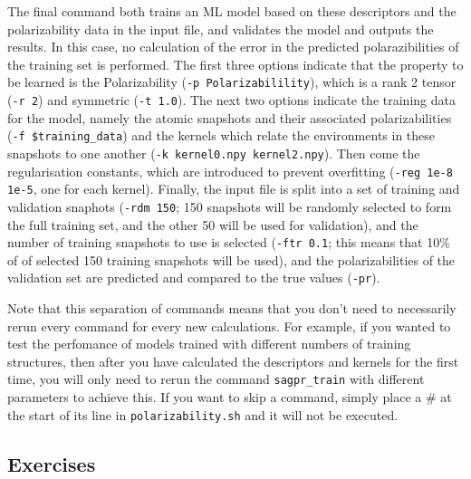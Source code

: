 \documentclass{article}
\begin{document}
The final command both trains an ML model based on these descriptors and the polarizability data in the input file, and validates the model and outputs the results. In this case, no calculation of the error in the predicted polarazibilities of the training set is performed. The first three options indicate that the property to be learned is the Polarizability (\verb|-p Polarizabilility|), which is a rank 2 tensor (\verb|-r 2|) and symmetric (\verb|-t 1.0|). The next two options indicate the training data for the model, namely the atomic snapshots and their associated polarizabilities (\verb|-f $training_data|) and the kernels which relate the environments in these snapshots to one another (\verb|-k kernel0.npy kernel2.npy|). Then come the regularisation constants, which are introduced to prevent overfitting (\verb|-reg 1e-8 1e-5|, one for each kernel). Finally, the input file is split into a set of training and validation snaphots (\verb|-rdm 150|; 150 snapshots will be randomly selected to form the full training set, and the other 50 will be used for validation), and the number of training snapshots to use is selected (\verb|-ftr 0.1|; this means that 10\% of of selected 150 training snapshots will be used), and the polarizabilities of the validation set are predicted and compared to the true values (\verb|-pr|).

Note that this separation of commands means that you don't need to necessarily rerun every command for every new calculations. For example, if you wanted to test the perfomance of models trained with different numbers of training structures, then after you have calculated the descriptors and kernels for the first time, you will only need to rerun the command \verb|sagpr_train| with different parameters to achieve this. If you want to skip a command, simply place a \# at the start of its line in \verb|polarizability.sh| and it will not be executed.

\subsection*{Exercises}
\end{document}
